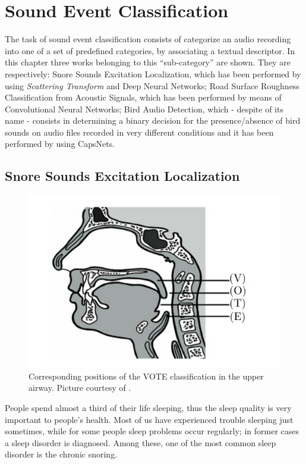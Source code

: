 \chapter{Sound Event Classification}

The task of sound event classification consists of categorize an audio recording into one of a set of predefined categories, by associating a textual descriptor. In this chapter three works belonging to this ``sub-category'' are shown. They are respectively: Snore Sounds Excitation Localization, which has been performed by using \textit{Scattering Transform} and Deep Neural Networks; Road Surface Roughness Classification from Acoustic Signals, which has been performed by means of Convolutional Neural Networks; Bird Audio Detection, which - despite of its name - consists in determining a binary decision for the presence/absence of bird sounds on audio files recorded in very different conditions and it has been performed by using CapsNets.

\section{Snore Sounds Excitation Localization}
\label{sec:snoring_classification}
\begin{figure}[h]
	\centering
	\includegraphics[width=0.6\linewidth]{img/vote.pdf}
	\caption[VOTE locations]{Corresponding positions of the VOTE classification in the upper airway. Picture courtesy of \cite{janott2014akustical}.} 
	\label{fig:vote}
\end{figure}

People spend almost a third of their life sleeping, thus the sleep quality is very important to people's health. Most of us  have experienced trouble sleeping just sometimes, while for some people sleep problems occur regularly; in former cases a sleep disorder is diagnosed. Among these, one of the most common sleep disorder \cite{sleep-disorders} is the chronic snoring.
 
